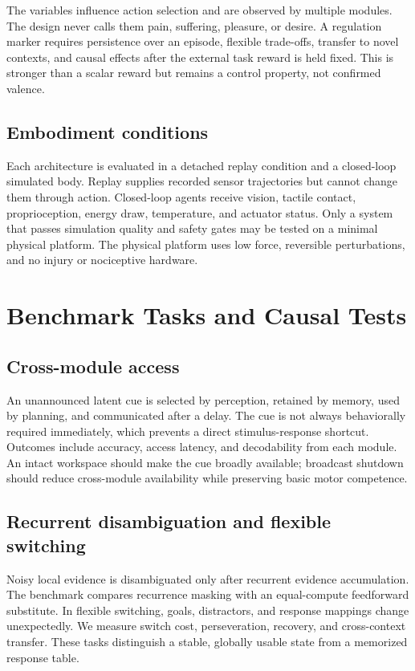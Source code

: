 \documentclass[conference]{IEEEtran}
\begin{document}
The variables influence action selection and are observed by multiple modules. The design never calls them pain, suffering, pleasure, or desire. A regulation marker requires persistence over an episode, flexible trade-offs, transfer to novel contexts, and causal effects after the external task reward is held fixed. This is stronger than a scalar reward but remains a control property, not confirmed valence.

\subsection{Embodiment conditions}

Each architecture is evaluated in a detached replay condition and a closed-loop simulated body. Replay supplies recorded sensor trajectories but cannot change them through action. Closed-loop agents receive vision, tactile contact, proprioception, energy draw, temperature, and actuator status. Only a system that passes simulation quality and safety gates may be tested on a minimal physical platform. The physical platform uses low force, reversible perturbations, and no injury or nociceptive hardware.

\section{Benchmark Tasks and Causal Tests}

\subsection{Cross-module access}

An unannounced latent cue is selected by perception, retained by memory, used by planning, and communicated after a delay. The cue is not always behaviorally required immediately, which prevents a direct stimulus-response shortcut. Outcomes include accuracy, access latency, and decodability from each module. An intact workspace should make the cue broadly available; broadcast shutdown should reduce cross-module availability while preserving basic motor competence.

\subsection{Recurrent disambiguation and flexible switching}

Noisy local evidence is disambiguated only after recurrent evidence accumulation. The benchmark compares recurrence masking with an equal-compute feedforward substitute. In flexible switching, goals, distractors, and response mappings change unexpectedly. We measure switch cost, perseveration, recovery, and cross-context transfer. These tasks distinguish a stable, globally usable state from a memorized response table.
\end{document}
